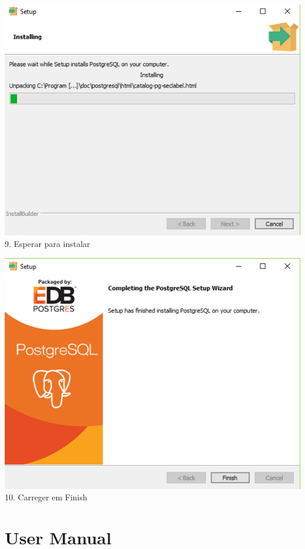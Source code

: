 \documentclass[a4paper, 11pt]{article}
\begin{document}
\begin{minipage}{0.45\textwidth}
  \includegraphics[width=\textwidth]{Screenshot-830.png}
  9. Esperar para instalar
\end{minipage}\hfill
\begin{minipage}{0.45\textwidth}
  \includegraphics[width=\textwidth]{Screenshot-937.png}
  10. Carreger em Finish
\end{minipage}

\newpage
\section{User Manual}
\end{document}

